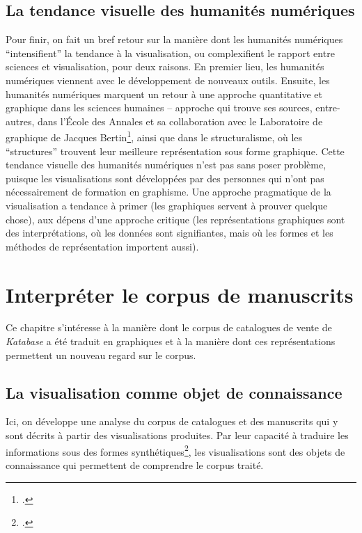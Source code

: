 \documentclass[a4paper, 12pt, twoside]{book}
\newcommand{\ktb}{\textit{Katabase}}
\begin{document}
\subsection{La tendance visuelle des humanités numériques}
Pour finir, on fait un bref retour sur la manière dont les humanités numériques \enquote{intensifient} la tendance à la visualisation, ou complexifient le rapport entre sciences et visualisation, pour deux raisons. En premier lieu, les humanités numériques viennent avec le développement de nouveaux outils. Ensuite, les humanités numériques marquent un retour à une approche quantitative et graphique dans les sciences humaines -- approche qui trouve ses sources, entre-autres, dans l'École des Annales et sa collaboration avec le Laboratoire de graphique de Jacques Bertin\footcite{orain_laboratoire_2021}, ainsi que dans le structuralisme, où les \enquote{structures} trouvent leur meilleure représentation sous forme graphique. Cette tendance visuelle des humanités numériques n'est pas sans poser problème, puisque les visualisations sont développées par des personnes qui n'ont pas nécessairement de formation en graphisme. Une approche pragmatique de la visualisation a tendance à primer (les graphiques servent à prouver quelque chose), aux dépens d'une approche critique (les représentations graphiques sont des interprétations, où les données sont signifiantes, mais où les formes et les méthodes de représentation importent aussi).


\section{Interpréter le corpus de manuscrits}
Ce chapitre s'intéresse à la manière dont le corpus de catalogues de vente de \ktb{} a été traduit en graphiques et à la manière dont ces représentations permettent un nouveau regard sur le corpus.

\subsection{La visualisation comme objet de connaissance}
Ici, on développe une analyse du corpus de catalogues et des manuscrits qui y sont décrits à partir des visualisations produites. Par leur capacité à traduire les informations sous des formes synthétiques\footcite[p. 36]{hentschel_visual_2014}, les visualisations sont des objets de connaissance qui permettent de comprendre le corpus traité.
\end{document}
